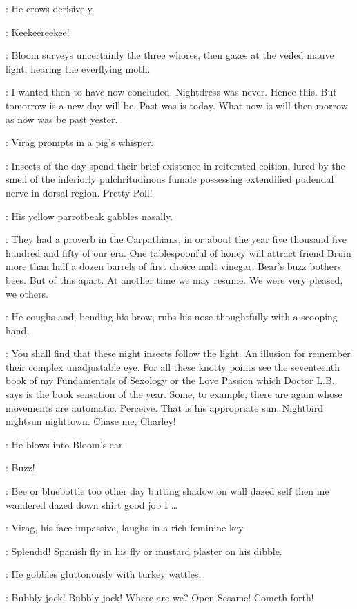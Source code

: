 :
He crows derisively.

\Virag:
Keekeereekee!

:
Bloom surveys uncertainly the three whores,
then gazes at the veiled mauve light, hearing the everflying moth.

\Bloom:
I wanted then to have now concluded.
Nightdress was never.
Hence this.
But tomorrow is a new day will be.
Past was is today.
What now is will then morrow
as now was be past yester.

:
Virag prompts in a pig's whisper.

\Virag:
Insects of the day spend their brief existence in reiterated coition,
lured by the smell of the inferiorly pulchritudinous fumale
possessing extendified pudendal nerve in dorsal region.
Pretty Poll!

:
His yellow parrotbeak gabbles nasally.

\Virag:
They had a proverb in the Carpathians, in or about the year
five thousand five hundred and fifty of our era.
One tablespoonful of honey will attract friend Bruin
more than half a dozen barrels of first choice malt vinegar.
Bear's buzz bothers bees.
But of this apart.
At another time we may resume.
We were very pleased, we others.

:
He coughs and, bending his brow,
rubs his nose thoughtfully with a scooping hand.

\Virag:
You shall find that these night insects follow the light.
An illusion for remember their complex unadjustable eye.
For all these knotty points see the seventeenth book
of my Fundamentals of Sexology or the Love Passion
which Doctor L.B. says is the book sensation of the year.
Some, to example, there are again whose movements are automatic.
Perceive.
That is his appropriate sun.
Nightbird nightsun nighttown.
Chase me, Charley!

:
He blows into Bloom's ear.

\Virag:
Buzz!

\Bloom:
Bee or bluebottle too other day butting shadow on wall dazed self
then me wandered dazed down shirt good job I \ldots%

:
Virag, his face impassive, laughs in a rich feminine key.

\Virag:
Splendid!
Spanish fly in his fly or mustard plaster on his dibble.

:
He gobbles gluttonously with turkey wattles.

\Virag:
Bubbly jock! Bubbly jock!
Where are we?
Open Sesame!
Cometh forth!

